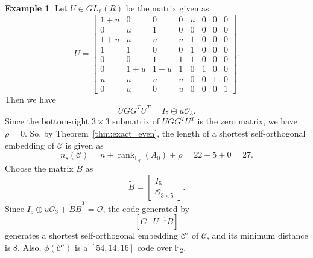 \documentclass{article}
\theoremstyle{definition}
\newtheorem{example}{Example}[section]
\theoremstyle{remark}
\begin{document}
\begin{example}
    Let $U\in GL_{8}(R)$ be the matrix given as
    \[
    U=\begin{bmatrix}
    1+u & 0 & 0 & 0 & u & 0 & 0 & 0\\
    0 & u & 1 & 0 & 0 & 0 & 0 & 0\\
    1+u & u & u & u & 1 & 0 & 0 & 0\\
    1 & 1 & 0 & 0 & 1 & 0 & 0 & 0\\
    0 & 0 & 1 & 1 & 1 & 0 & 0 & 0\\
    0 & 1+u & 1+u & 1 & 0 & 1 & 0 & 0\\
    u & u & u & u & 0 & 0 & 1 & 0\\
    0 & u & 0 & u & 0 & 0 & 0 & 1
    \end{bmatrix}.
    \]
    Then we have
    \[
    UGG^TU^T=I_5\oplus u\mathcal{O}_3.
    \]
    Since the bottom-right $3\times 3$ submatrix of $UGG^TU^T$ is the zero matrix, we have $\rho=0$. So, by Theorem~\ref{thm:exact_even}, the length of a shortest self-orthogonal embedding of $\mathcal{C}$ is given as
    \[
    n_s(\mathcal{C})=n+\operatorname{rank}_{\mathbb{F}_q}(A_0)+\rho=22+5+0=27.
    \]
    Choose the matrix $\tilde{B}$ as 
    \[
    \tilde{B} = \begin{bmatrix}
        I_5\\\mathcal{O}_{3\times 5}
    \end{bmatrix}.
    \]
    Since $I_5\oplus u\mathcal{O}_3+\tilde{B}\tilde{B}^T=\mathcal{O}$, the code generated by
    \[
    [G~|~U^{-1}\tilde{B}]
    \]
    generates a shortest self-orthogonal embedding $\mathcal{C}'$ of $\mathcal{C}$, and its minimum distance is 8. Also, $\phi(\mathcal{C}')$ is a $[54, 14, 16]$ code over $\mathbb{F}_2$.


\end{example}
\end{document}
